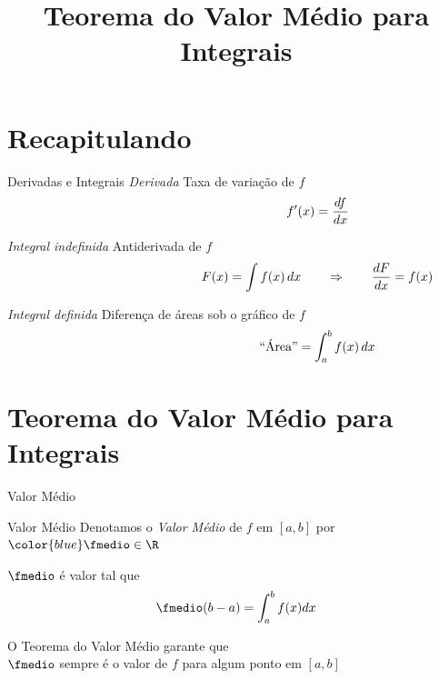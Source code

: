 
\usepackage{integracao_e_series}

\title{Teorema do Valor Médio para Integrais}



\addtitle

\section{Recapitulando}

\begin{frame}{Derivadas e Integrais}
  \emph{Derivada}
  \tabto{37mm}Taxa de variação de $f$
  \[
    \hspace{45mm}
    f'(x) = \frac{df}{dx}
  \]

  \pause
  \emph{Integral indefinida}
  \tabto{37mm}Antiderivada de $f$
  \[
    \hspace{45mm}
    F(x) = \int f(x)\,dx \qquad\Rightarrow\qquad \frac{dF}{dx} = f(x)
  \]

  \pause
  \emph{Integral definida}
  \tabto{37mm}Diferença de áreas sob o gráfico de $f$
  \[
    \hspace{45mm}
    \text{``Área''} = \int_a^b f(x)\,dx
  \]
\end{frame}

\section{Teorema do Valor Médio para Integrais}

\begin{frame}{Valor Médio}
  \centering
  \vspace{\baselineskip}
  
\end{frame}

\begin{frame}{Valor Médio}
  Denotamos o \emph{Valor Médio} de $f$ em $[a, b]$
  por \({\color{blue}\fmedio}\in\R\)

  \pause
  \vspace{\baselineskip}
  \(\fmedio\) é valor tal que
  \[
    \fmedio(b-a) = \int_a^b f(x) dx
  \]

  \pause
  O Teorema do Valor Médio garante que\\[1mm]
  \pause
  \(\fmedio\) sempre é o valor de $f$ para algum ponto em $[a, b]$
\end{frame}

